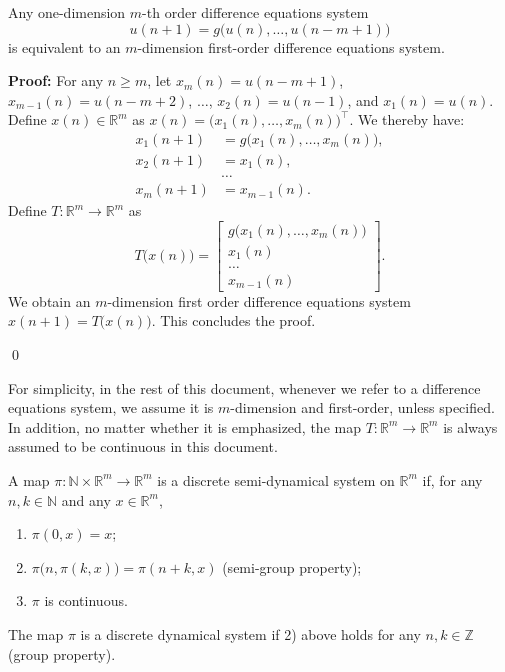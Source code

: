 \documentclass[10pt]{svmult}
\newcommand{\QED}{\begin{flushright}\qed \end{flushright}}
\begin{document}
\begin{lemma}\label{lem-transf-first-order}
Any one-dimension $m$-th order difference equations system
\begin{equation*}
u(n+1) = g\big( u(n),\dots,u(n-m+1) \big)
\end{equation*}
is equivalent to an $m$-dimension first-order difference equations system.
\end{lemma}

\textbf{Proof:} For any $n\ge m$, let $x_m(n)=u(n-m+1)$, $x_{m-1}(n)=u(n-m+2)$, $\dots$, $x_2(n)=u(n-1)$, and $x_1(n)=u(n)$. Define $x(n)\in \mathbb{R}^m$ as $x(n)=\big(x_1(n),\dots,x_m(n)  \big)^{\top}$. We thereby have:
\begin{align*}
x_1(n+1) & = g\big( x_1(n),\dots,x_m(n) \big),\\
x_2(n+1) & = x_1(n),\\
         & \dots \\
x_m(n+1) & = x_{m-1}(n).
\end{align*}
Define $T:\mathbb{R}^{m}\to \mathbb{R}^m$ as
\begin{equation*}
T\big( x(n) \big) = 
\begin{bmatrix}
g\big( x_1(n),\dots,x_m(n) \big) \\
x_1(n) \\
\dots \\
x_{m-1}(n)
\end{bmatrix}.
\end{equation*}
We obtain an $m$-dimension first order difference equations system $x(n+1)=T\big( x(n) \big)$. This concludes the proof. \QED


For simplicity, in the rest of this document, whenever we refer to a difference equations system, we assume it is $m$-dimension and first-order, unless specified. In addition, no matter whether it is emphasized, the map $T:\mathbb{R}^m \to \mathbb{R}^m$ is always assumed to be continuous in this document.

\begin{definition}\label{def:(semi)-dyn-sys}
A map $\pi:\mathbb{N}\times \mathbb{R}^m \to \mathbb{R}^m$ is a discrete semi-dynamical system on $\mathbb{R}^m$ if, for any $n,k\in \mathbb{N}$ and any $x\in \mathbb{R}^m$, 
\begin{enumerate}[label={\arabic*)}]
\item $\pi(0,x)=x$;
\item $\pi\big( n,\pi(k,x) \big) = \pi(n+k,x)$ (semi-group property);
\item $\pi$ is continuous. 
\end{enumerate}
The map $\pi$ is a discrete dynamical system if 2) above holds for any $n,k\in \mathbb{Z}$ (group property).
\end{definition}
\end{document}
